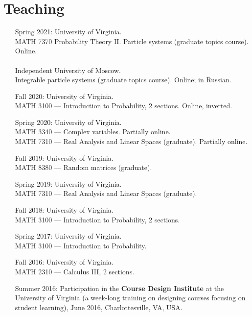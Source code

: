 \documentclass[letterpaper,11pt]{article}
\begin{document}
\section*{Teaching}

\begin{itemize}
	\item 
	[Spring 2021:]
	University of Virginia.
	\\
	MATH 7370 Probability Theory II. Particle systems (graduate topics course). Online.
	\\\\
	Independent University of Moscow.
	\\
	Integrable particle systems (graduate topics course). Online; in Russian.
	
\item[Fall 2020:]
	University of Virginia. \\ MATH 3100 --- Introduction to
	Probability, 2 sections. Online, inverted.
	\item 
				[Spring 2020:]
				University of Virginia. 
				\\ 
				MATH 3340 --- Complex variables. Partially online.
				\\
				MATH 7310 --- Real Analysis and Linear Spaces (graduate). Partially online.
	\item 
				[Fall 2019:]
				University of Virginia. \\ MATH 8380 --- Random matrices (graduate).
	\item 
				[Spring 2019:]
				University of Virginia. \\ MATH 7310 --- Real Analysis and Linear Spaces (graduate).
	\item
	      [Fall 2018:]
	      University of Virginia. \\ MATH 3100 --- Introduction to
				Probability, 2 sections.
	\item
	      [Spring 2017:]
	      University of Virginia. \\ MATH 3100 --- Introduction to
	      Probability.

	\item
	      [Fall 2016:]
	      University of Virginia. \\ MATH 2310 --- Calculus III, 2
	      sections.

	\item
	      [Summer 2016:] Participation in the \textbf{Course Design
		      Institute} at
	      the University of Virginia (a week-long training on designing
	      courses focusing on student learning), June 2016, Charlottesville, VA, USA.


\end{itemize}
\end{document}
